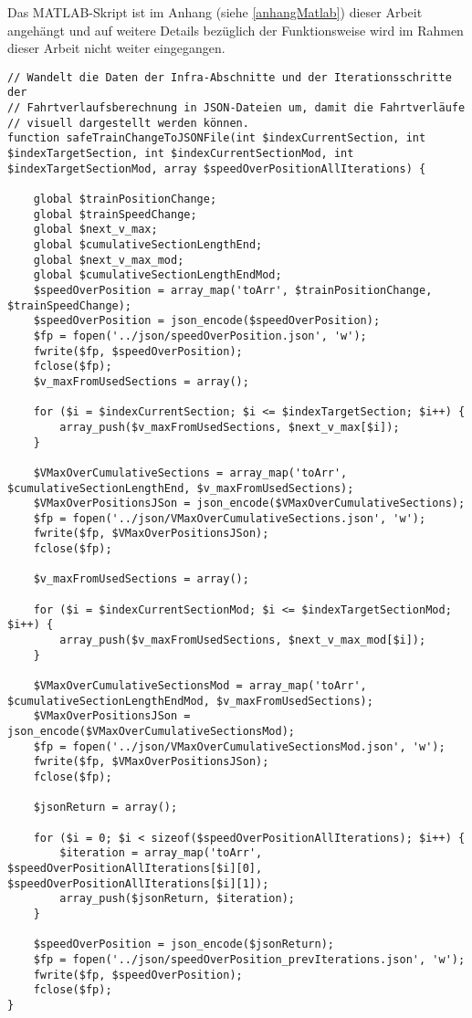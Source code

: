 Das MATLAB-Skript ist im Anhang (siehe \ref{anhangMatlab}) dieser Arbeit angehängt und auf weitere Details bezüglich der Funktionsweise wird im Rahmen dieser Arbeit nicht weiter eingegangen.
\begin{lstlisting}[caption={\textit{safeTrainChangeToJSONFile$($$)$} (\textit{functions\_fahrtverlauf.php})},captionpos=b,label={lst:safeTrainChangeToJSONFile}]
// Wandelt die Daten der Infra-Abschnitte und der Iterationsschritte der
// Fahrtverlaufsberechnung in JSON-Dateien um, damit die Fahrtverläufe
// visuell dargestellt werden können.
function safeTrainChangeToJSONFile(int $indexCurrentSection, int $indexTargetSection, int $indexCurrentSectionMod, int $indexTargetSectionMod, array $speedOverPositionAllIterations) {

	global $trainPositionChange;
	global $trainSpeedChange;
	global $next_v_max;
	global $cumulativeSectionLengthEnd;
	global $next_v_max_mod;
	global $cumulativeSectionLengthEndMod;
	$speedOverPosition = array_map('toArr', $trainPositionChange, $trainSpeedChange);
	$speedOverPosition = json_encode($speedOverPosition);
	$fp = fopen('../json/speedOverPosition.json', 'w');
	fwrite($fp, $speedOverPosition);
	fclose($fp);
	$v_maxFromUsedSections = array();

	for ($i = $indexCurrentSection; $i <= $indexTargetSection; $i++) {
		array_push($v_maxFromUsedSections, $next_v_max[$i]);
	}

	$VMaxOverCumulativeSections = array_map('toArr', $cumulativeSectionLengthEnd, $v_maxFromUsedSections);
	$VMaxOverPositionsJSon = json_encode($VMaxOverCumulativeSections);
	$fp = fopen('../json/VMaxOverCumulativeSections.json', 'w');
	fwrite($fp, $VMaxOverPositionsJSon);
	fclose($fp);

	$v_maxFromUsedSections = array();

	for ($i = $indexCurrentSectionMod; $i <= $indexTargetSectionMod; $i++) {
		array_push($v_maxFromUsedSections, $next_v_max_mod[$i]);
	}

	$VMaxOverCumulativeSectionsMod = array_map('toArr', $cumulativeSectionLengthEndMod, $v_maxFromUsedSections);
	$VMaxOverPositionsJSon = json_encode($VMaxOverCumulativeSectionsMod);
	$fp = fopen('../json/VMaxOverCumulativeSectionsMod.json', 'w');
	fwrite($fp, $VMaxOverPositionsJSon);
	fclose($fp);

	$jsonReturn = array();

	for ($i = 0; $i < sizeof($speedOverPositionAllIterations); $i++) {
		$iteration = array_map('toArr', $speedOverPositionAllIterations[$i][0], $speedOverPositionAllIterations[$i][1]);
		array_push($jsonReturn, $iteration);
	}

	$speedOverPosition = json_encode($jsonReturn);
	$fp = fopen('../json/speedOverPosition_prevIterations.json', 'w');
	fwrite($fp, $speedOverPosition);
	fclose($fp);
}
\end{lstlisting}